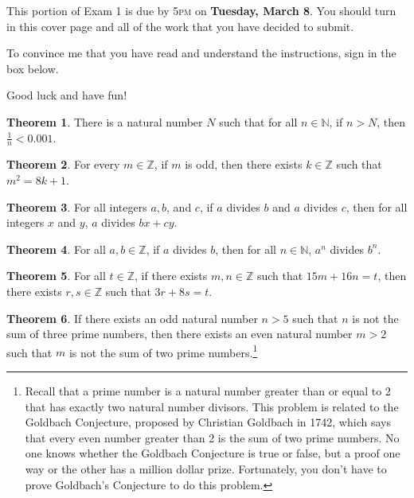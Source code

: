 \documentclass[11pt]{article}
\theoremstyle{definition}
\newtheorem{theorem}{Theorem}
\begin{document}
This portion of  Exam 1 is due by 5\textsc{pm} on \textbf{Tuesday, March 8}.  You should turn in this cover page and all of the work that you have decided to submit.

\bigskip

To convince me that you have read and understand the instructions, sign in the box below.

\bigskip


\bigskip

Good luck and have fun!

\newpage

\begin{theorem}
There is a natural number $N$ such that for all $n\in\mathbb{N}$, if $n>N$, then $\frac{1}{n}<0.001$.
\end{theorem}

\begin{theorem}
For every $m\in\mathbb{Z}$, if $m$ is odd, then there exists $k\in\mathbb{Z}$ such that $m^2=8k+1$.
\end{theorem}

\begin{theorem}
For all integers $a, b$, and $c$, if $a$ divides $b$ and $a$ divides $c$, then for all integers $x$ and $y$, $a$ divides $bx+cy$.
\end{theorem}

\begin{theorem}
For all $a,b\in\mathbb{Z}$, if $a$ divides $b$, then for all $n\in\mathbb{N}$, $a^{n}$ divides $b^{n}$.
\end{theorem}

\begin{theorem}
For all $t\in\mathbb{Z}$, if there exists $m,n\in\mathbb{Z}$ such that $15m+16n=t$, then there exists $r,s\in\mathbb{Z}$ such that $3r+8s=t$.
\end{theorem}

\begin{theorem}
If there exists an odd natural number $n>5$ such that $n$ is not the sum of three prime numbers, then there exists an even natural number $m>2$ such that $m$ is not the sum of two prime numbers.\footnote{Recall that a prime number is a natural number greater than or equal to 2 that has exactly two natural number divisors.  This problem is related to the Goldbach Conjecture, proposed by Christian Goldbach in 1742, which says that every even number greater than 2 is the sum of two prime numbers.  No one knows whether the Goldbach Conjecture is true or false, but a proof one way or the other has a million dollar prize.  Fortunately, you don't have to prove Goldbach's Conjecture to do this problem.}
\end{theorem}
\end{document}
